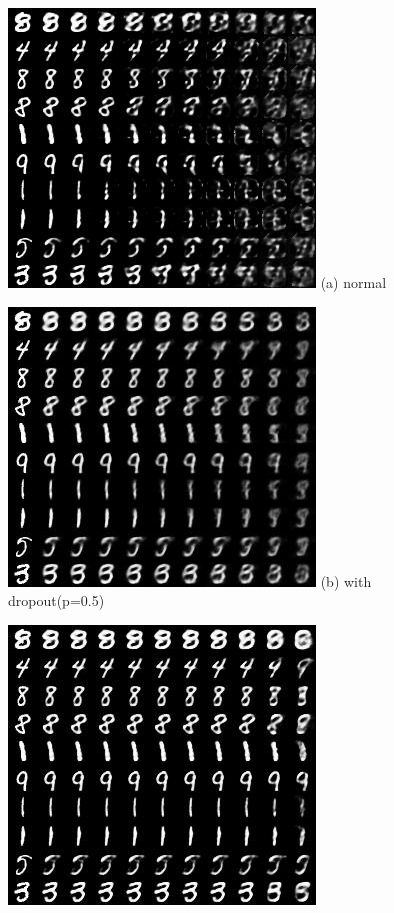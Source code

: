 \documentclass{article}
\begin{document}
    \begin{figure}
    \begin{minipage}{0.33\linewidth}
      \begin{center}
        \includegraphics[scale=0.4]{mnist_ae_wo_50.jpg}
        \hspace{1.6cm} (a) normal
      \end{center}
    \end{minipage}
    \begin{minipage}{0.33\linewidth}
      \begin{center}
        \includegraphics[scale=0.4]{mnist_ae_dropout_50.jpg}
        \hspace{1.6cm} (b) with dropout(p=0.5)
      \end{center}
    \end{minipage}
    \begin{minipage}{0.33\linewidth}
      \begin{center}
        \includegraphics[scale=0.4]{mnist_ae_chopout_50.jpg}

\end{center}
\end{minipage}
\end{figure}
\end{document}
